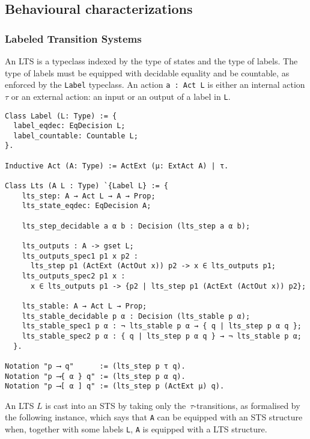 \subsection{Behavioural characterizations}

\subsubsection{Labeled Transition Systems}

An LTS is a typeclass indexed by the type of states and the type of labels. The
type of labels must be equipped with decidable equality and be countable, as
enforced by the \texttt{Label} typeclass.
%
An action \lstinline|a : Act L| is either an internal action $\tau$ or an external
action: an input or an output of a label in \texttt{L}.

\begin{mdframed}
\begin{verbatim}
Class Label (L: Type) := {
  label_eqdec: EqDecision L;
  label_countable: Countable L;
}.

Inductive Act (A: Type) := ActExt (μ: ExtAct A) | τ.

Class Lts (A L : Type) `{Label L} := {
    lts_step: A → Act L → A → Prop;
    lts_state_eqdec: EqDecision A;

    lts_step_decidable a α b : Decision (lts_step a α b);

    lts_outputs : A -> gset L;
    lts_outputs_spec1 p1 x p2 :
      lts_step p1 (ActExt (ActOut x)) p2 -> x ∈ lts_outputs p1;
    lts_outputs_spec2 p1 x :
      x ∈ lts_outputs p1 -> {p2 | lts_step p1 (ActExt (ActOut x)) p2};

    lts_stable: A → Act L → Prop;
    lts_stable_decidable p α : Decision (lts_stable p α);
    lts_stable_spec1 p α : ¬ lts_stable p α → { q | lts_step p α q };
    lts_stable_spec2 p α : { q | lts_step p α q } → ¬ lts_stable p α;
  }.

Notation "p ⟶ q"      := (lts_step p τ q).
Notation "p ⟶{ α } q" := (lts_step p α q).
Notation "p ⟶[ α ] q" := (lts_step p (ActExt μ) q).
\end{verbatim}
\end{mdframed}

An LTS $L$ is cast into an STS by taking only the~$\tau$-transitions, as
formalised by the following instance, which says that \texttt{A} can be
equipped with an STS structure when, together with some labels \texttt{L},
\texttt{A} is equipped with a LTS structure.

